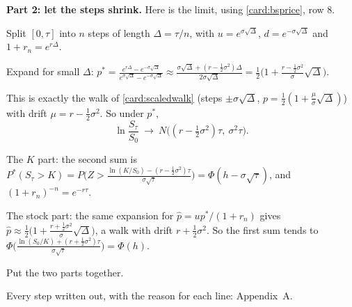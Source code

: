 \begin{problem}[Q2(a)]
\textbf{Part 2: let the steps shrink.} Here is the limit, using \cref{card:bsprice}, row 8.
\begin{steps}[resume]
\item Split $[0,\tau]$ into $n$ steps of length $\Delta=\tau/n$, with $u=e^{\sigma\sqrt\Delta}$, $d=e^{-\sigma\sqrt\Delta}$ and $1+r_n=e^{r\Delta}$.
\item Expand for small $\Delta$: $p^*=\frac{e^{r\Delta}-e^{-\sigma\sqrt\Delta}}{e^{\sigma\sqrt\Delta}-e^{-\sigma\sqrt\Delta}}\approx\frac{\sigma\sqrt\Delta+(r-\frac12\sigma^2)\Delta}{2\sigma\sqrt\Delta}=\frac12\Big(1+\frac{r-\frac12\sigma^2}{\sigma}\sqrt\Delta\Big)$.
\item This is exactly the walk of \cref{card:scaledwalk} (steps $\pm\sigma\sqrt\Delta$, $p=\frac12(1+\frac\mu\sigma\sqrt\Delta)$) with drift $\mu=r-\frac12\sigma^2$. So under $p^*$,
\[
\ln\frac{S_\tau}{S_0}\ \longrightarrow\ N\big((r-\tfrac12\sigma^2)\tau,\ \sigma^2\tau\big).
\]
\item The $K$ part: the second sum is $P^*(S_\tau>K)=P\Big(Z>\frac{\ln(K/S_0)-(r-\frac12\sigma^2)\tau}{\sigma\sqrt\tau}\Big)=\Phi(h-\sigma\sqrt\tau)$, and $(1+r_n)^{-n}=e^{-r\tau}$.
\item The stock part: the same expansion for $\hat p=up^*/(1+r_n)$ gives $\hat p\approx\frac12\big(1+\frac{r+\frac12\sigma^2}{\sigma}\sqrt\Delta\big)$, a walk with drift $r+\frac12\sigma^2$. So the first sum tends to $\Phi\Big(\frac{\ln(S_0/K)+(r+\frac12\sigma^2)\tau}{\sigma\sqrt\tau}\Big)=\Phi(h)$.
\item Put the two parts together.
\end{steps}
Every step written out, with the reason for each line: Appendix~A.
\end{problem}

